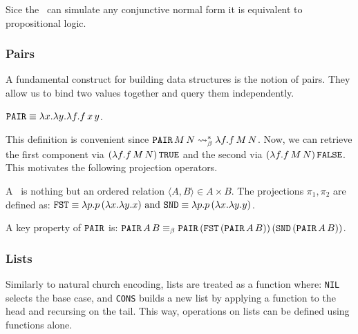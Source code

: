 \begin{corollary}
  Sice the \lcalc \ can simulate any conjunctive normal form it is equivalent to propositional logic.
\end{corollary}

\subsubsection{\centering Pairs}

A fundamental construct for building data structures is the notion of pairs. 
They allow us to bind two values together and query them independently.

\begin{definition}
  \( \texttt{PAIR} \equiv \lambda x.\lambda y.\lambda f. f\,x\,y \).
\end{definition}

\begin{remark}
  This definition is convenient since 
  \(
    \texttt{PAIR} \, M \, N \mathrel{\leadsto}_\beta^* \lambda f . f \, M \, N
  \).
  Now, we can retrieve the first component via 
  \( (\lambda f . f \, M \, N) \, \texttt{TRUE} \) 
  and the second via 
  \( (\lambda f . f \, M \, N) \, \texttt{FALSE} \). 
  This motivates the following projection operators.
\end{remark}

\begin{definition}
  A \PAIR \ is nothing but an ordered relation $\langle A, B \rangle \in A \times B$.  
  The projections $\pi_1, \pi_2$ are defined as:
  \(
    \texttt{FST} \equiv \lambda p. p\,(\lambda x.\lambda y. x) \text{ and }
    \texttt{SND} \equiv \lambda p. p\,(\lambda x.\lambda y. y)
  \).
\end{definition}

\begin{proposition}
  A key property of $ \texttt{PAIR} $ is:
  \(
    \texttt{PAIR} \, A \, B \equiv_\beta 
    \texttt{PAIR} \, (\texttt{FST} \, (\texttt{PAIR} \, A \, B)) \, (\texttt{SND} \, (\texttt{PAIR} \, A \, B))
  \).
\end{proposition}

\subsubsection{\centering Lists}
Similarly to natural church encoding, lists are treated as a function where: \texttt{NIL} selects the base case, and \texttt{CONS} builds a new list by applying a function to the head and recursing on the tail. This way, operations on lists can be defined using functions alone.

